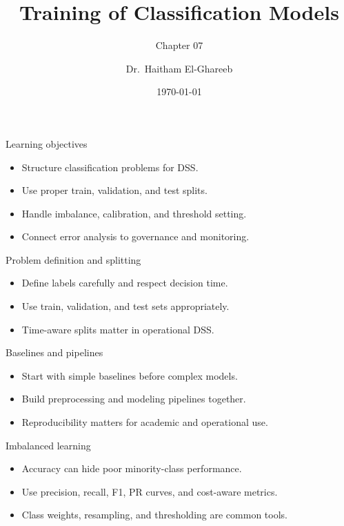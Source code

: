 \documentclass[aspectratio=169,11pt]{beamer}
\title[Classification Training]{Training of Classification Models}
\subtitle{Chapter 07}
\author{Dr.\ Haitham El-Ghareeb}
\institute{Faculty of Computers and Information Sciences}
\date{\today}
\begin{document}
\begin{frame}
  \titlepage
\end{frame}

\begin{frame}{Learning objectives}
  \begin{itemize}
    \item Structure classification problems for DSS.
    \item Use proper train, validation, and test splits.
    \item Handle imbalance, calibration, and threshold setting.
    \item Connect error analysis to governance and monitoring.
  \end{itemize}
\end{frame}

\begin{frame}{Problem definition and splitting}
  \begin{itemize}
    \item Define labels carefully and respect decision time.
    \item Use train, validation, and test sets appropriately.
    \item Time-aware splits matter in operational DSS.
  \end{itemize}
\end{frame}

\begin{frame}{Baselines and pipelines}
  \begin{itemize}
    \item Start with simple baselines before complex models.
    \item Build preprocessing and modeling pipelines together.
    \item Reproducibility matters for academic and operational use.
  \end{itemize}
\end{frame}

\begin{frame}{Imbalanced learning}
  \begin{itemize}
    \item Accuracy can hide poor minority-class performance.
    \item Use precision, recall, F1, PR curves, and cost-aware metrics.
    \item Class weights, resampling, and thresholding are common tools.
  \end{itemize}
\end{frame}
\end{document}
